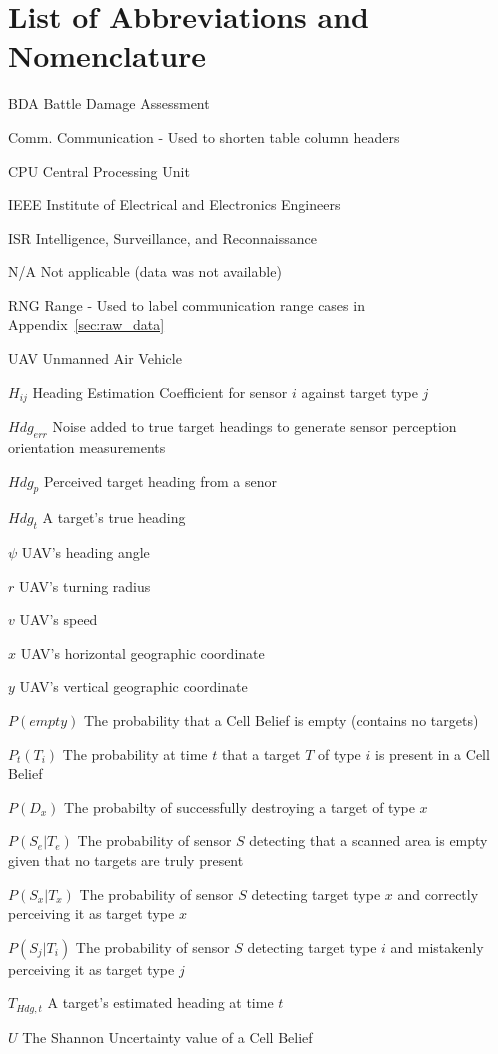 \chapter*{List of Abbreviations and Nomenclature}
\begin{abbrv}
\item[BDA]				Battle Damage Assessment
\item[Comm.]            Communication - Used to shorten table column headers
\item[CPU]				Central Processing Unit
\item[IEEE]				Institute of Electrical and Electronics Engineers
\item[ISR]              Intelligence, Surveillance, and Reconnaissance
\item[N/A]              Not applicable (data was not available)
\item[RNG]              Range - Used to label communication range cases in Appendix~\ref{sec:raw_data}
\item[UAV]				Unmanned Air Vehicle
\item[$H_{ij}$] 		Heading Estimation Coefficient for sensor $i$ against target type $j$
\item[$Hdg_{err}$]      Noise added to true target headings to generate sensor perception orientation measurements
\item[$Hdg_{p}$]        Perceived target heading from a senor
\item[$Hdg_{t}$]        A target's true heading
\item[$\psi$]           UAV's heading angle
\item[$r$]              UAV's turning radius
\item[$v$] 				UAV's speed
\item[$x$]			    UAV's horizontal geographic coordinate
\item[$y$]			    UAV's vertical geographic coordinate
\item[$P(empty)$] 		The probability that a Cell Belief is empty (contains no targets)
\item[$P_{t}(T_{i})$]   The probability at time $t$ that a target $T$ of type $i$ is present in a Cell Belief
\item[$P(D_{x})$]       The probabilty of successfully destroying a target of type $x$
\item[$P(S_{e}|T_{e})$] The probability of sensor $S$ detecting that a scanned area is empty given that no targets are truly present
\item[$P(S_{x}|T_{x})$] The probability of sensor $S$ detecting target type $x$ and correctly perceiving it as target type $x$
\item[$P(S_{j}|T_{i})$] The probability of sensor $S$ detecting target type $i$ and mistakenly perceiving it as target type $j$
\item[$T_{Hdg,t}$]      A target's estimated heading at time $t$
\item[$U$]              The Shannon Uncertainty value of a Cell Belief
\end{abbrv}